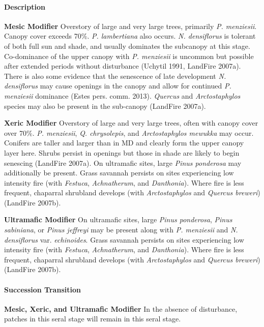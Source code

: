 \paragraph{Description}
\begin{adjustwidth}{2cm}{}
\textbf{Mesic Modifier } Overstory of large and very large trees, primarily \emph{P. menziesii}. Canopy cover exceeds 70\%. \emph{P. lambertiana} also occurs. \emph{N. densiflorus} is tolerant of both full sun and shade, and usually dominates the subcanopy at this stage. Co-dominance of the upper canopy with \emph{P. menziesii} is uncommon but possible after extended periods without disturbance (Uchytil 1991, LandFire 2007a). There is also some evidence that the senescence of late development \emph{N. densiflorus} may cause openings in the canopy and allow for continued \emph{P. menziesii} dominance (Estes pers. comm. 2013). \emph{Quercus} and \emph{Arctostaphylos} species may also be present in the sub-canopy (LandFire 2007a).

\medskip
\noindent \textbf{Xeric Modifier} Overstory of large and very large trees, often with canopy cover over 70\%. \emph{P. menziesii}, \emph{Q. chrysolepis}, and \emph{Arctostaphylos mewukka} may occur. Conifers are taller and larger than in MD and clearly form the upper canopy layer here. Shrubs persist in openings but those in shade are likely to begin senescing (LandFire 2007a). On ultramafic sites, large \emph{Pinus ponderosa} may additionally be present. Grass savannah persists on sites experiencing low intensity fire (with \emph{Festuca}, \emph{Achnatherum}, and \emph{Danthonia}). Where fire is less frequent, chaparral shrubland develops (with \emph{Arctostaphylos} and \emph{Quercus breweri}) (LandFire 2007b).

\medskip
\noindent \textbf{Ultramafic Modifier} On ultramafic sites, large \emph{Pinus ponderosa}, \emph{Pinus sabiniana}, or \emph{Pinus jeffreyi} may be present along with \emph{P. menziesii} and \emph{N. densiflorus} var. \emph{echinoides}. Grass savannah persists on sites experiencing low intensity fire (with \emph{Festuca}, \emph{Achnatherum}, and \emph{Danthonia}). Where fire is less frequent, chaparral shrubland develops (with \emph{Arctostaphylos} and \emph{Quercus breweri}) (LandFire 2007b).

\end{adjustwidth}

\paragraph{Succession Transition}
\begin{adjustwidth}{2cm}{}
\textbf{Mesic, Xeric, and Ultramafic Modifier } In the absence of disturbance, patches in this seral stage will remain in this seral stage. 

\end{adjustwidth}

